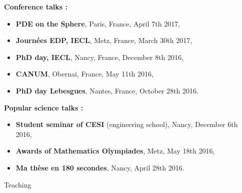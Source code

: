 \documentclass[10pt,a4paper]{report}
\begin{document}
\vspace{0.4cm}
\noindent
{\selectfont
\textbf{Conference talks :}
}

\begin{itemize}
\item \textbf{PDE on the Sphere}, Paris, France, April 7th 2017,
\item \textbf{Journées EDP, IECL}, Metz, France, March 30th 2017,
\item \textbf{PhD day, IECL}, Nancy, France, December 8th 2016,
\item \textbf{CANUM}, Obernai, France, May 11th 2016,
\item \textbf{PhD day Lebesgues}, Nantes, France, October 28th 2016.
\end{itemize}

\vspace{0.4cm}
\noindent
{\selectfont
\textbf{Popular science talks :}
}
\begin{itemize}
\item \textbf{Student seminar of CESI }(engineering school), Nancy, December 6th 2016,
\item \textbf{Awards of Mathematics Olympiades}, Metz, May 18th 2016,
\item \textbf{Ma thèse en 180 secondes}, Nancy, April 28th 2016.
\end{itemize}

\vspace{1cm}
\noindent
{\selectfont
\begin{Large}
Teaching
\end{Large}
\hrulefill
}
\end{document}
